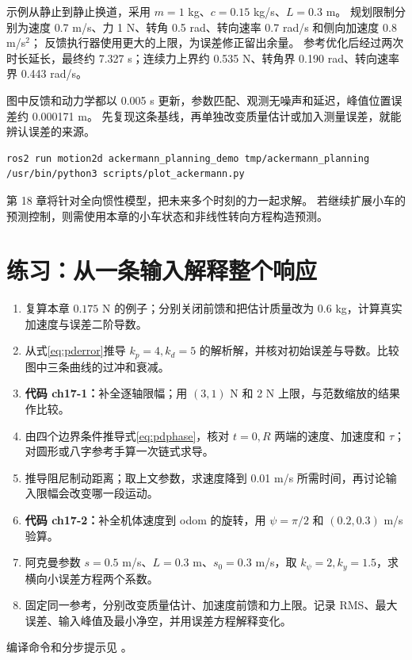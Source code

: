 示例从静止到静止换道，采用 $m=1$ kg、$c=0.15$ kg/s、$L=0.3$ m。
规划限制分别为速度 0.7 m/s、力 1 N、转角 0.5 rad、转向速率 0.7 rad/s 和侧向加速度 0.8 m/s$^2$；
反馈执行器使用更大的上限，为误差修正留出余量。
参考优化后经过两次时长延长，最终约 7.327 s；连续力上界约 0.535 N、转角界 0.190 rad、转向速率界 0.443 rad/s。

图中反馈和动力学都以 0.005 s 更新，参数匹配、观测无噪声和延迟，峰值位置误差约 0.000171 m。
先复现这条基线，再单独改变质量估计或加入测量误差，就能辨认误差的来源。
\begin{lstlisting}[language=bash,numbers=none]
ros2 run motion2d ackermann_planning_demo tmp/ackermann_planning
/usr/bin/python3 scripts/plot_ackermann.py
\end{lstlisting}
第 18 章将针对全向惯性模型，把未来多个时刻的力一起求解。
若继续扩展小车的预测控制，则需使用本章的小车状态和非线性转向方程构造预测。

\section{练习：从一条输入解释整个响应}
\begin{enumerate}
\item 复算本章 $0.175$ N 的例子；分别关闭前馈和把估计质量改为 0.6 kg，计算真实加速度与误差二阶导数。
\item 从式\eqref{eq:pderror}推导 $k_p=4,k_d=5$ 的解析解，并核对初始误差与导数。比较图中三条曲线的过冲和衰减。
\item \textbf{代码 ch17-1：}补全逐轴限幅；用 $(3,1)$ N 和 2 N 上限，与范数缩放的结果作比较。
\item 由四个边界条件推导式\eqref{eq:pdphase}，核对 $t=0,R$ 两端的速度、加速度和 $\tau$；对圆形或八字参考手算一次链式求导。
\item 推导阻尼制动距离；取上文参数，求速度降到 0.01 m/s 所需时间，再讨论输入限幅会改变哪一段运动。
\item \textbf{代码 ch17-2：}补全机体速度到 odom 的旋转，用 $\psi=\pi/2$ 和 $(0.2,0.3)$ m/s 验算。
\item 阿克曼参数 $s=0.5$ m/s、$L=0.3$ m、$s_0=0.3$ m/s，取 $k_\psi=2,k_y=1.5$，求横向小误差方程两个系数。
\item 固定同一参考，分别改变质量估计、加速度前馈和力上限。记录 RMS、最大误差、输入峰值及最小净空，并用误差方程解释变化。
\end{enumerate}
编译命令和分步提示见 。
